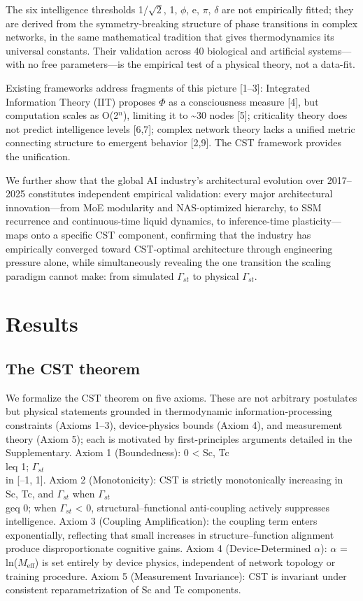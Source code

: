 \documentclass[a4paper,12pt]{article}
\begin{document}
The six intelligence thresholds {1/$\sqrt{2}$, 1, $\phi$, e, $\pi$, $\delta$} are not empirically fitted; they are derived from the symmetry-breaking structure of phase transitions in complex networks, in the same mathematical tradition that gives thermodynamics its universal constants. Their validation across 40 biological and artificial systems---with no free parameters---is the empirical test of a physical theory, not a data-fit.


Existing frameworks address fragments of this picture [1--3]: Integrated Information Theory (IIT) proposes $\Phi$ as a consciousness measure [4], but computation scales as O(2$^n$), limiting it to \textasciitilde{}30 nodes [5]; criticality theory does not predict intelligence levels [6,7]; complex network theory lacks a unified metric connecting structure to emergent behavior [2,9]. The CST framework provides the unification.


We further show that the global AI industry's architectural evolution over 2017--2025 constitutes independent empirical validation: every major architectural innovation---from MoE modularity and NAS-optimized hierarchy, to SSM recurrence and continuous-time liquid dynamics, to inference-time plasticity---maps onto a specific CST component, confirming that the industry has empirically converged toward CST-optimal architecture through engineering pressure alone, while simultaneously revealing the one transition the scaling paradigm cannot make: from simulated $\Gamma_{st}$ to physical $\Gamma_{st}$.



\section{Results}


\subsection{The CST theorem}

We formalize the CST theorem on five axioms. These are not arbitrary postulates but physical statements grounded in thermodynamic information-processing constraints (Axioms 1--3), device-physics bounds (Axiom 4), and measurement theory (Axiom 5); each is motivated by first-principles arguments detailed in the Supplementary. Axiom 1 (Boundedness): 0 < Sc, Tc  \\leq  1; $\Gamma_{st}$  \\in  [--1, 1]. Axiom 2 (Monotonicity): CST is strictly monotonically increasing in Sc, Tc, and $\Gamma_{st}$ when $\Gamma_{st}$  \\geq  0; when $\Gamma_{st}$ < 0, structural--functional anti-coupling actively suppresses intelligence. Axiom 3 (Coupling Amplification): the coupling term enters exponentially, reflecting that small increases in structure--function alignment produce disproportionate cognitive gains. Axiom 4 (Device-Determined $\alpha$): $\alpha$ = ln($M_{\text{eff}}$) is set entirely by device physics, independent of network topology or training procedure. Axiom 5 (Measurement Invariance): CST is invariant under consistent reparametrization of Sc and Tc components.
\end{document}
